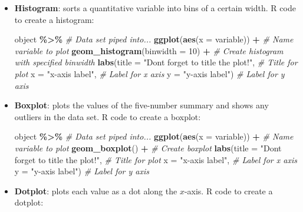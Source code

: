 \documentclass[
]{report}
\newenvironment{Shaded}{\begin{snugshade}}{\end{snugshade}}
\newcommand{\AttributeTok}[1]{\textcolor[rgb]{0.13,0.29,0.53}{#1}}
\newcommand{\CommentTok}[1]{\textcolor[rgb]{0.56,0.35,0.01}{\textit{#1}}}
\newcommand{\DecValTok}[1]{\textcolor[rgb]{0.00,0.00,0.81}{#1}}
\newcommand{\FunctionTok}[1]{\textcolor[rgb]{0.13,0.29,0.53}{\textbf{#1}}}
\newcommand{\NormalTok}[1]{#1}
\newcommand{\SpecialCharTok}[1]{\textcolor[rgb]{0.81,0.36,0.00}{\textbf{#1}}}
\newcommand{\StringTok}[1]{\textcolor[rgb]{0.31,0.60,0.02}{#1}}
\begin{document}
\begin{itemize}
\item
  \textbf{Histogram}: sorts a quantitative variable into bins of a certain width. R code to create a histogram:

\begin{Shaded}
\begin{Highlighting}[]
\NormalTok{object }\SpecialCharTok{\%\textgreater{}\%} \CommentTok{\# Data set piped into...}
    \FunctionTok{ggplot}\NormalTok{(}\FunctionTok{aes}\NormalTok{(}\AttributeTok{x =}\NormalTok{ variable)) }\SpecialCharTok{+}   \CommentTok{\# Name variable to plot}
    \FunctionTok{geom\_histogram}\NormalTok{(}\AttributeTok{binwidth =} \DecValTok{10}\NormalTok{) }\SpecialCharTok{+}  \CommentTok{\# Create histogram with specified binwidth}
    \FunctionTok{labs}\NormalTok{(}\AttributeTok{title =} \StringTok{"Don\textquotesingle{}t forget to title the plot!"}\NormalTok{, }\CommentTok{\# Title for plot}
        \AttributeTok{x =} \StringTok{"x{-}axis label"}\NormalTok{, }\CommentTok{\# Label for x axis}
        \AttributeTok{y =} \StringTok{"y{-}axis label"}\NormalTok{) }\CommentTok{\# Label for y axis}
\end{Highlighting}
\end{Shaded}
\item
  \textbf{Boxplot}: plots the values of the five-number summary and shows any outliers in the data set. R code to create a boxplot:

\begin{Shaded}
\begin{Highlighting}[]
\NormalTok{object }\SpecialCharTok{\%\textgreater{}\%} \CommentTok{\# Data set piped into...}
    \FunctionTok{ggplot}\NormalTok{(}\FunctionTok{aes}\NormalTok{(}\AttributeTok{x =}\NormalTok{ variable)) }\SpecialCharTok{+} \CommentTok{\# Name variable to plot}
    \FunctionTok{geom\_boxplot}\NormalTok{() }\SpecialCharTok{+} \CommentTok{\# Create boxplot }
    \FunctionTok{labs}\NormalTok{(}\AttributeTok{title =} \StringTok{"Don\textquotesingle{}t forget to title the plot!"}\NormalTok{, }\CommentTok{\# Title for plot}
        \AttributeTok{x =} \StringTok{"x{-}axis label"}\NormalTok{, }\CommentTok{\# Label for x axis}
        \AttributeTok{y =} \StringTok{"y{-}axis label"}\NormalTok{) }\CommentTok{\# Label for y axis}
\end{Highlighting}
\end{Shaded}
\item
  \textbf{Dotplot}: plots each value as a dot along the \(x\)-axis. R code to create a dotplot:


\end{itemize}
\end{document}
